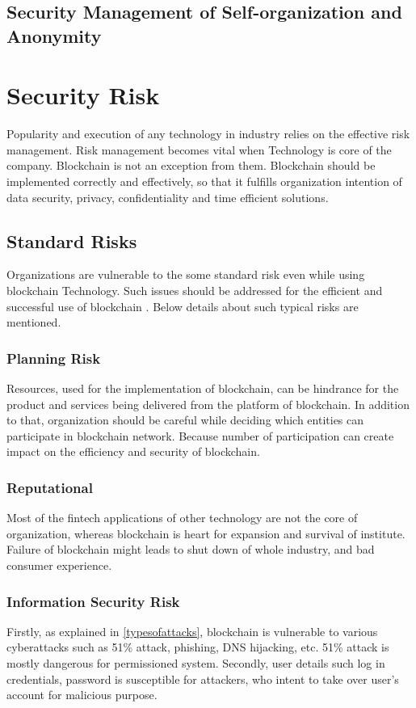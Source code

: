 \documentclass[a4paper,twoside,12pt]{report}
\begin{document}
\begin{spacing}{1.5}
\subsection{Security Management of Self-organization and Anonymity}
\cite{fangfangdai}
\section{Security Risk}
Popularity and execution of any technology in industry relies on the effective risk management. Risk management becomes vital when Technology is core of the company. Blockchain is not an exception from them. Blockchain should be implemented correctly and effectively, so that it fulfills organization intention of data security, privacy, confidentiality and time efficient solutions.
\subsection{Standard Risks}
Organizations are vulnerable to the some standard risk even while using blockchain Technology. Such issues should be addressed for the efficient and successful use of blockchain \cite{securityrisk}. Below details about such typical risks are mentioned. 
\subsubsection{Planning Risk}
Resources, used for the implementation of blockchain, can be hindrance for the product and services being delivered from the platform of blockchain. In addition to that, organization should be careful while deciding which entities can participate in blockchain network. Because number of participation can create impact on the efficiency and security of blockchain.    
\subsubsection{Reputational}
Most of the fintech applications of other technology are not the core of organization, whereas blockchain is heart for expansion and survival of institute. Failure of blockchain might leads to shut down of whole industry, and bad consumer experience.   
\subsubsection{Information Security Risk}
Firstly, as explained in \ref{typesofattacks}, blockchain is vulnerable to various cyberattacks such as 51\% attack, phishing, DNS hijacking, etc. 51\% attack is mostly dangerous for permissioned system. Secondly, user details such log in credentials, password is susceptible for attackers, who intent to take over user's account for malicious purpose. 	

\end{spacing}
\end{document}
